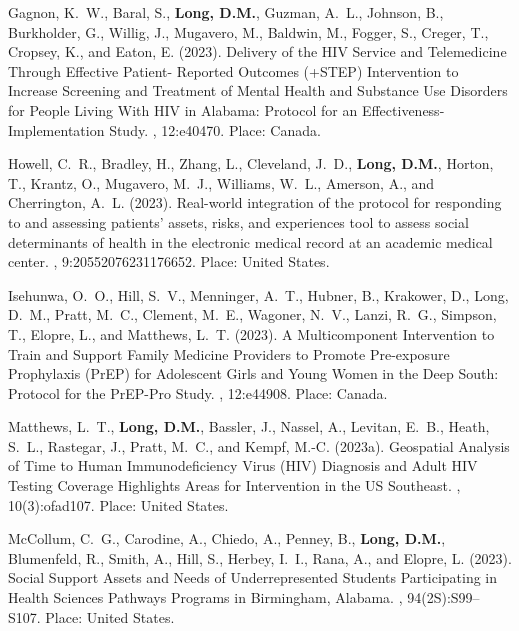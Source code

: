 \begin{thebibliography}{}
Gagnon, K.~W., Baral, S., \textbf{Long, D.M.}, Guzman, A.~L., Johnson, B., Burkholder, G.,
  Willig, J., Mugavero, M., Baldwin, M., Fogger, S., Creger, T., Cropsey, K.,
  and Eaton, E. (2023).
\newblock Delivery of the {HIV} {Service} and {Telemedicine} {Through}
  {Effective} {Patient}- {Reported} {Outcomes} (+{STEP}) {Intervention} to
  {Increase} {Screening} and {Treatment} of {Mental} {Health} and {Substance}
  {Use} {Disorders} for {People} {Living} {With} {HIV} in {Alabama}: {Protocol}
  for an {Effectiveness}-{Implementation} {Study}.
, 12:e40470.
\newblock Place: Canada.

Howell, C.~R., Bradley, H., Zhang, L., Cleveland, J.~D., \textbf{Long, D.M.}, Horton, T.,
  Krantz, O., Mugavero, M.~J., Williams, W.~L., Amerson, A., and Cherrington,
  A.~L. (2023).
\newblock Real-world integration of the protocol for responding to and
  assessing patients' assets, risks, and experiences tool to assess social
  determinants of health in the electronic medical record at an academic
  medical center.
, 9:20552076231176652.
\newblock Place: United States.

Isehunwa, O.~O., Hill, S.~V., Menninger, A.~T., Hubner, B., Krakower, D., Long,
  D.~M., Pratt, M.~C., Clement, M.~E., Wagoner, N.~V., Lanzi, R.~G., Simpson,
  T., Elopre, L., and Matthews, L.~T. (2023).
\newblock A {Multicomponent} {Intervention} to {Train} and {Support} {Family}
  {Medicine} {Providers} to {Promote} {Pre}-exposure {Prophylaxis} ({PrEP}) for
  {Adolescent} {Girls} and {Young} {Women} in the {Deep} {South}: {Protocol}
  for the {PrEP}-{Pro} {Study}.
, 12:e44908.
\newblock Place: Canada.

Matthews, L.~T., \textbf{Long, D.M.}, Bassler, J., Nassel, A., Levitan, E.~B., Heath,
  S.~L., Rastegar, J., Pratt, M.~C., and Kempf, M.-C. (2023a).
\newblock Geospatial {Analysis} of {Time} to {Human} {Immunodeficiency} {Virus}
  ({HIV}) {Diagnosis} and {Adult} {HIV} {Testing} {Coverage} {Highlights}
  {Areas} for {Intervention} in the {US} {Southeast}.
, 10(3):ofad107.
\newblock Place: United States.

McCollum, C.~G., Carodine, A., Chiedo, A., Penney, B., \textbf{Long, D.M.}, Blumenfeld,
  R., Smith, A., Hill, S., Herbey, I.~I., Rana, A., and Elopre, L. (2023).
\newblock Social {Support} {Assets} and {Needs} of {Underrepresented}
  {Students} {Participating} in {Health} {Sciences} {Pathways} {Programs} in
  {Birmingham}, {Alabama}.
,
  94(2S):S99--S107.
\newblock Place: United States.


\end{thebibliography}
